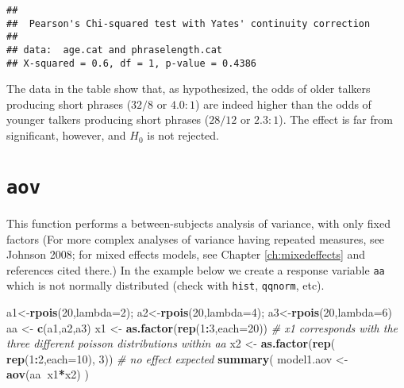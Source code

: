 \documentclass[]{book}
\newenvironment{Shaded}{\begin{snugshade}}{\end{snugshade}}
\newcommand{\CommentTok}[1]{\textcolor[rgb]{0.56,0.35,0.01}{\textit{#1}}}
\newcommand{\DataTypeTok}[1]{\textcolor[rgb]{0.13,0.29,0.53}{#1}}
\newcommand{\DecValTok}[1]{\textcolor[rgb]{0.00,0.00,0.81}{#1}}
\newcommand{\KeywordTok}[1]{\textcolor[rgb]{0.13,0.29,0.53}{\textbf{#1}}}
\newcommand{\NormalTok}[1]{#1}
\newcommand{\OperatorTok}[1]{\textcolor[rgb]{0.81,0.36,0.00}{\textbf{#1}}}
\newcommand{\StringTok}[1]{\textcolor[rgb]{0.31,0.60,0.02}{#1}}
\begin{document}
\begin{verbatim}
## 
##  Pearson's Chi-squared test with Yates' continuity correction
## 
## data:  age.cat and phraselength.cat
## X-squared = 0.6, df = 1, p-value = 0.4386
\end{verbatim}

The data in the table show that, as hypothesized, the odds of older talkers producing short phrases (\(32/8\) or \(4.0:1\)) are indeed higher than the odds of younger talkers producing short phrases (\(28/12\) or \(2.3:1\)). The effect is far from significant, however, and \(H_0\) is not rejected.

\hypertarget{aov}{%
\section{\texorpdfstring{\texttt{aov}}{aov}}\label{aov}}

This function performs a between-subjects analysis of variance, with
only fixed factors \citep{john08} (For more complex
analyses of variance having repeated measures, see Johnson 2008; for mixed effects models, see Chapter \ref{ch:mixedeffects} and references cited there.)
In the example below we create a
response variable \texttt{aa} which is not normally distributed
(check
with \texttt{hist}, \texttt{qqnorm}, etc).\\

\begin{Shaded}
\begin{Highlighting}[]
\NormalTok{a1<-}\KeywordTok{rpois}\NormalTok{(}\DecValTok{20}\NormalTok{,}\DataTypeTok{lambda=}\DecValTok{2}\NormalTok{); a2<-}\KeywordTok{rpois}\NormalTok{(}\DecValTok{20}\NormalTok{,}\DataTypeTok{lambda=}\DecValTok{4}\NormalTok{); a3<-}\KeywordTok{rpois}\NormalTok{(}\DecValTok{20}\NormalTok{,}\DataTypeTok{lambda=}\DecValTok{6}\NormalTok{) }
\NormalTok{aa <-}\StringTok{ }\KeywordTok{c}\NormalTok{(a1,a2,a3) }
\NormalTok{x1 <-}\StringTok{ }\KeywordTok{as.factor}\NormalTok{(}\KeywordTok{rep}\NormalTok{(}\DecValTok{1}\OperatorTok{:}\DecValTok{3}\NormalTok{,}\DataTypeTok{each=}\DecValTok{20}\NormalTok{)) }
\CommentTok{# x1 corresponds with the three different poisson distributions within aa}
\NormalTok{x2 <-}\StringTok{ }\KeywordTok{as.factor}\NormalTok{(}\KeywordTok{rep}\NormalTok{( }\KeywordTok{rep}\NormalTok{(}\DecValTok{1}\OperatorTok{:}\DecValTok{2}\NormalTok{,}\DataTypeTok{each=}\DecValTok{10}\NormalTok{), }\DecValTok{3}\NormalTok{)) }\CommentTok{# no effect expected}
\KeywordTok{summary}\NormalTok{( model1.aov <-}\StringTok{ }\KeywordTok{aov}\NormalTok{(aa}\OperatorTok{~}\NormalTok{x1}\OperatorTok{*}\NormalTok{x2) )}
\end{Highlighting}
\end{Shaded}
\end{document}
